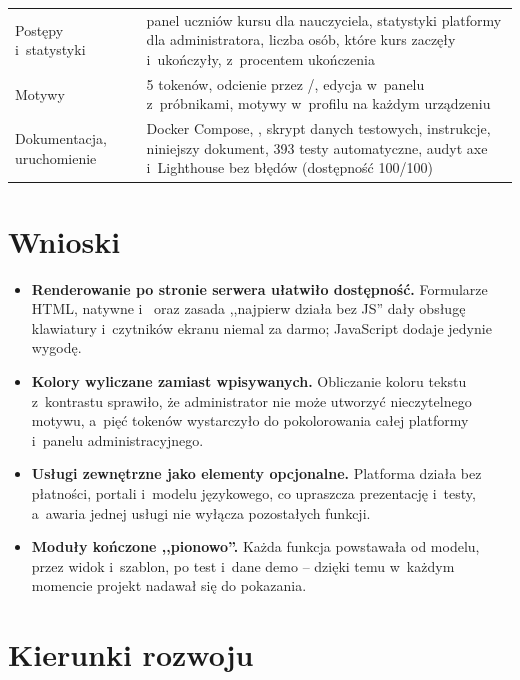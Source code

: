 \begin{table}[H]
\begin{tabularx}{\linewidth}{@{}P{3.8cm}L@{}}
Postępy i~statystyki & panel uczniów kursu dla nauczyciela, statystyki platformy dla administratora, liczba osób, które kurs zaczęły i~ukończyły, z~procentem ukończenia \\
Motywy & 5 tokenów, odcienie przez /, edycja w~panelu z~próbnikami, motywy w~profilu na każdym urządzeniu \\
Dokumentacja, uruchomienie & Docker Compose, , skrypt danych testowych, instrukcje, niniejszy dokument, 393 testy automatyczne, audyt axe i~Lighthouse bez błędów (dostępność 100/100) \\
\bottomrule
\end{tabularx}
\end{table}

\section{Wnioski}

\begin{itemize}
  \item \textbf{Renderowanie po stronie serwera ułatwiło dostępność.} Formularze HTML,
        natywne  i~ oraz zasada ,,najpierw działa bez JS'' dały
        obsługę klawiatury i~czytników ekranu niemal za darmo; JavaScript dodaje jedynie
        wygodę.
  \item \textbf{Kolory wyliczane zamiast wpisywanych.} Obliczanie koloru tekstu
        z~kontrastu sprawiło, że administrator nie może utworzyć nieczytelnego motywu,
        a~pięć tokenów wystarczyło do pokolorowania całej platformy i~panelu administracyjnego.
  \item \textbf{Usługi zewnętrzne jako elementy opcjonalne.} Platforma działa bez
        płatności, portali i~modelu językowego, co upraszcza prezentację i~testy, a~awaria
        jednej usługi nie wyłącza pozostałych funkcji.
  \item \textbf{Moduły kończone ,,pionowo''.} Każda funkcja powstawała od modelu, przez
        widok i~szablon, po test i~dane demo -- dzięki temu w~każdym momencie projekt nadawał
        się do pokazania.
\end{itemize}

\section{Kierunki rozwoju}

